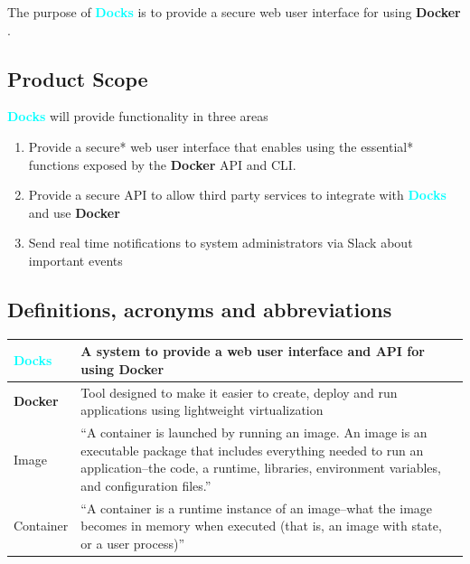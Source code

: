 \documentclass[]{article}
\newcommand{\docks}{\textbf{\textcolor{Cyan}{Docks}} }
\newcommand{\docker}{\textbf{\textcolor{OliveGreen}{Docker}} }
\begin{document}
The purpose of \docks is to provide a secure web user interface
for using \docker.

\subsection{Product Scope}

\docks will provide functionality in three areas
\begin{enumerate}
	\item Provide a secure* web user interface that enables using the
	      essential* functions exposed by the \docker API and CLI.
	\item Provide a secure API to allow third party services to integrate
	      with \docks and use \docker
	\item Send real time notifications to system administrators via Slack about
	      important events
\end{enumerate}

\subsection{Definitions, acronyms and abbreviations}

\begin{table}[H]
	\begin{tabular}{|p{2cm}|p{10cm}|}
		\hline
		\docks &  A system to provide a web user interface and API for using \docker \\ \hline

		\docker & Tool designed to make it easier to create, deploy and run applications
		using lightweight virtualization \\ \hline

		Image & ``A container is launched by running an image.
		An image is an executable package that includes everything
		needed to run an application--the code, a runtime, libraries,
		environment variables, and configuration files.'' \\ \hline

		Container & ``A container is a runtime instance 
		of an image--what the image becomes in memory when 
		executed (that is, an image with state, or a user process)'' \\ \hline

	\end{tabular}
\end{table}
\end{document}
